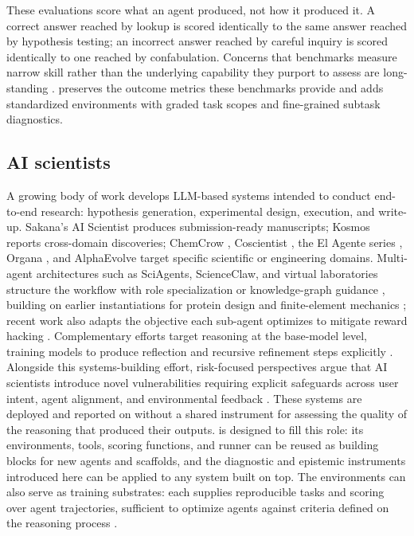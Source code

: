 These evaluations score what an agent produced, not how it produced it. A correct answer reached by lookup is scored identically to the same answer reached by hypothesis testing; an incorrect answer reached by careful inquiry is scored identically to one reached by confabulation. Concerns that benchmarks measure narrow skill rather than the underlying capability they purport to assess are long-standing \autocite{chollet2019measure}. \corral preserves the outcome metrics these benchmarks provide and adds standardized environments with graded task scopes and fine-grained subtask diagnostics.

\subsection{AI scientists}

A growing body of work develops LLM-based systems intended to conduct end-to-end research: hypothesis generation, experimental design, execution, and write-up. Sakana's AI Scientist \autocite{lu2026towards} produces submission-ready manuscripts; Kosmos \autocite{mitchener2025kosmos} reports cross-domain discoveries; ChemCrow \autocite{MBran2024augmenting}, Coscientist \autocite{Boiko2023autonomous}, the El Agente series \autocite{zou2025agente}, Organa \autocite{Darvish2025organa}, and AlphaEvolve \autocite{novikov2025alphaevolve0} target specific scientific or engineering domains. Multi-agent architectures such as SciAgents, ScienceClaw, and virtual laboratories structure the workflow with role specialization or knowledge-graph guidance \autocite{ghafarollahi2025sciagents, wang2026autonomous, swanson2025virtual}, building on earlier instantiations for protein design \autocite{ghafarollahi2024protagents} and finite-element mechanics \autocite{ni2024mechagents}; recent work also adapts the objective each sub-agent optimizes to mitigate reward hacking \autocite{du2025accelerating}. Complementary efforts target reasoning at the base-model level, training models to produce reflection and recursive refinement steps explicitly \autocite{buehler2025preflexor}. Alongside this systems-building effort, risk-focused perspectives argue that AI scientists introduce novel vulnerabilities requiring explicit safeguards across user intent, agent alignment, and environmental feedback \autocite{Tang2025}. These systems are deployed and reported on without a shared instrument for assessing the quality of the reasoning that produced their outputs. \corral is designed to fill this role: its environments, tools, scoring functions, and runner can be reused as building blocks for new agents and scaffolds, and the diagnostic and epistemic instruments introduced here can be applied to any system built on top. The environments can also serve as training substrates: each supplies reproducible tasks and scoring over agent trajectories, sufficient to optimize agents against criteria defined on the reasoning process \autocite{ma2026skillclaw0}.

